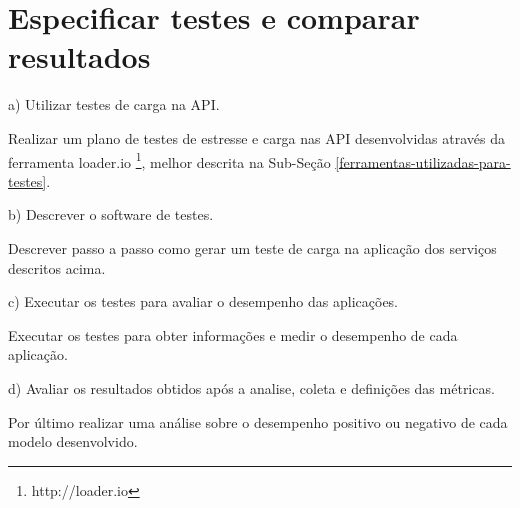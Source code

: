 \section{Especificar testes e comparar resultados}

  \begin{compactitem}
    \item[a)] Utilizar testes de carga na \ac{API}.
    
    Realizar um plano de testes de estresse e carga nas \ac{API} desenvolvidas através
    da ferramenta loader.io \footnote{\label{noteloader}http://loader.io}, melhor descrita na Sub-Seção \ref{ferramentas-utilizadas-para-testes}.
    
    
    \item[b)] Descrever o software de testes.
    
    Descrever passo a passo como gerar um teste de carga na aplicação dos serviços descritos acima.
    
    \item[c)] Executar os testes para avaliar o desempenho das aplicações.
    
    Executar os testes para obter informações e medir o desempenho de cada aplicação.
    
    \item[d)] Avaliar os resultados obtidos após a analise, coleta e definições das métricas.
    
    Por último realizar uma análise sobre o desempenho positivo ou negativo de cada modelo desenvolvido.
    
    
  \end{compactitem}




